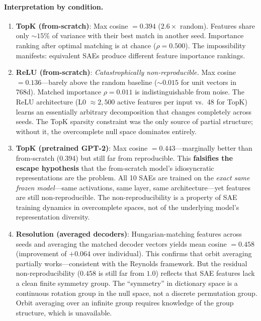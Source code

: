 \documentclass{article}
\begin{document}
\paragraph{Interpretation by condition.}

\begin{enumerate}
\item \textbf{TopK (from-scratch)}: Max cosine $= 0.394$ ($2.6\times$ random). Features share only ${\sim}15\%$ of variance with their best match in another seed. Importance ranking after optimal matching is at chance ($\rho = 0.500$). The impossibility manifests: equivalent SAEs produce different feature importance rankings.

\item \textbf{ReLU (from-scratch)}: \emph{Catastrophically non-reproducible.} Max cosine $= 0.136$---barely above the random baseline (${\sim}0.015$ for unit vectors in 768d). Matched importance $\rho = 0.011$ is indistinguishable from noise. The ReLU architecture (L0 $\approx 2{,}500$ active features per input vs.\ 48 for TopK) learns an essentially arbitrary decomposition that changes completely across seeds. The TopK sparsity constraint was the only source of partial structure; without it, the overcomplete null space dominates entirely.

\item \textbf{TopK (pretrained GPT-2)}: Max cosine $= 0.443$---marginally better than from-scratch (0.394) but still far from reproducible. This \textbf{falsifies the escape hypothesis} that the from-scratch model's idiosyncratic representations are the problem. All 10 SAEs are trained on the \emph{exact same frozen model}---same activations, same layer, same architecture---yet features are still non-reproducible. The non-reproducibility is a property of SAE training dynamics in overcomplete spaces, not of the underlying model's representation diversity.

\item \textbf{Resolution (averaged decoders)}: Hungarian-matching features across seeds and averaging the matched decoder vectors yields mean cosine $= 0.458$ (improvement of $+0.064$ over individual). This confirms that orbit averaging partially works---consistent with the Reynolds framework. But the residual non-reproducibility ($0.458$ is still far from $1.0$) reflects that SAE features lack a clean finite symmetry group. The ``symmetry'' in dictionary space is a continuous rotation group in the null space, not a discrete permutation group. Orbit averaging over an infinite group requires knowledge of the group structure, which is unavailable.
\end{enumerate}
\end{document}
